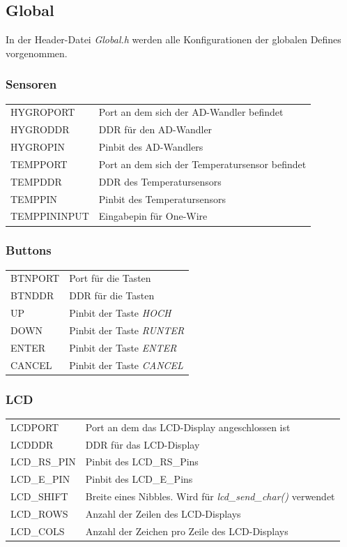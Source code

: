 \documentclass[10pt]{scrartcl}
\begin{document}
\subsection{Global}
In der Header-Datei \textit{Global.h} werden alle Konfigurationen der globalen Defines vorgenommen.
\subsubsection{Sensoren}
\begin{flushleft}
\begin{tabularx}{\textwidth}{XX}
HYGROPORT & Port an dem sich der AD-Wandler befindet\\
HYGRODDR & DDR für den AD-Wandler\\
HYGROPIN & Pinbit des AD-Wandlers\\
TEMPPORT & Port an dem sich der Temperatursensor befindet\\
TEMPDDR & DDR des Temperatursensors\\
TEMPPIN & Pinbit des Temperatursensors\\
TEMPPININPUT & Eingabepin für One-Wire\\
\end{tabularx}
\end{flushleft}
\subsubsection{Buttons}
\begin{flushleft}
\begin{tabularx}{\textwidth}{XX}
BTNPORT & Port für die Tasten\\
BTNDDR & DDR für die Tasten\\
UP & Pinbit der Taste \textit{HOCH}\\
DOWN & Pinbit der Taste \textit{RUNTER}\\
ENTER & Pinbit der Taste \textit{ENTER}\\
CANCEL & Pinbit der Taste \textit{CANCEL}\\
\end{tabularx}
\end{flushleft}
\subsubsection{LCD}
\begin{flushleft}
\begin{tabularx}{\textwidth}{XX}
LCDPORT & Port an dem das LCD-Display angeschlossen ist\\
LCDDDR & DDR für das LCD-Display\\
LCD\_RS\_PIN & Pinbit des LCD\_RS\_Pins\\
LCD\_E\_PIN & Pinbit des LCD\_E\_Pins\\
LCD\_SHIFT & Breite eines Nibbles. Wird für \textit{lcd\_send\_char()} verwendet\\
LCD\_ROWS & Anzahl der Zeilen des LCD-Displays\\
LCD\_COLS & Anzahl der Zeichen pro Zeile des LCD-Displays\\
\end{tabularx}
\end{flushleft}
\end{document}
